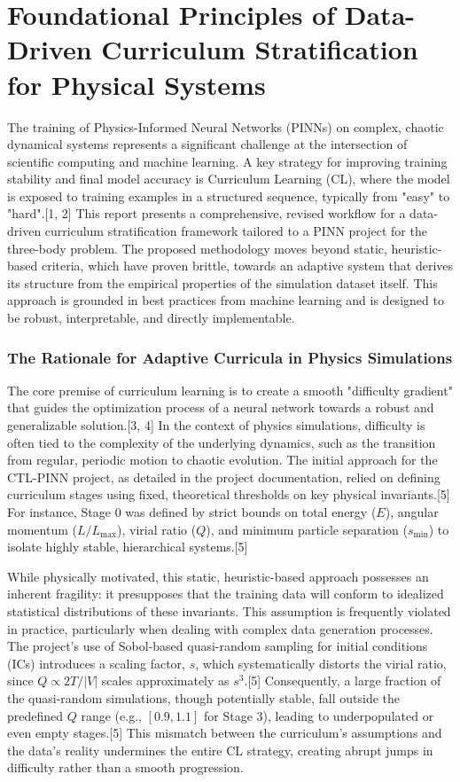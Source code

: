 \part{Foundational Principles of Data-Driven Curriculum Stratification for Physical Systems}

The training of Physics-Informed Neural Networks (PINNs) on complex, chaotic dynamical systems represents a significant challenge at the intersection of scientific computing and machine learning. A key strategy for improving training stability and final model accuracy is Curriculum Learning (CL), where the model is exposed to training examples in a structured sequence, typically from "easy" to "hard".[1, 2] This report presents a comprehensive, revised workflow for a data-driven curriculum stratification framework tailored to a PINN project for the three-body problem. The proposed methodology moves beyond static, heuristic-based criteria, which have proven brittle, towards an adaptive system that derives its structure from the empirical properties of the simulation dataset itself. This approach is grounded in best practices from machine learning and is designed to be robust, interpretable, and directly implementable.

\section{The Rationale for Adaptive Curricula in Physics Simulations}

The core premise of curriculum learning is to create a smooth "difficulty gradient" that guides the optimization process of a neural network towards a robust and generalizable solution.[3, 4] In the context of physics simulations, difficulty is often tied to the complexity of the underlying dynamics, such as the transition from regular, periodic motion to chaotic evolution. The initial approach for the CTL-PINN project, as detailed in the project documentation, relied on defining curriculum stages using fixed, theoretical thresholds on key physical invariants.[5] For instance, Stage 0 was defined by strict bounds on total energy ($E$), angular momentum ($L/L_{\text{max}}$), virial ratio ($Q$), and minimum particle separation ($s_{\text{min}}$) to isolate highly stable, hierarchical systems.[5]

While physically motivated, this static, heuristic-based approach possesses an inherent fragility: it presupposes that the training data will conform to idealized statistical distributions of these invariants. This assumption is frequently violated in practice, particularly when dealing with complex data generation processes. The project's use of Sobol-based quasi-random sampling for initial conditions (ICs) introduces a scaling factor, $s$, which systematically distorts the virial ratio, since $Q \propto 2T/|V|$ scales approximately as $s^3$.[5] Consequently, a large fraction of the quasi-random simulations, though potentially stable, fall outside the predefined $Q$ range (e.g., $[0.9, 1.1]$ for Stage 3), leading to underpopulated or even empty stages.[5] This mismatch between the curriculum's assumptions and the data's reality undermines the entire CL strategy, creating abrupt jumps in difficulty rather than a smooth progression.

